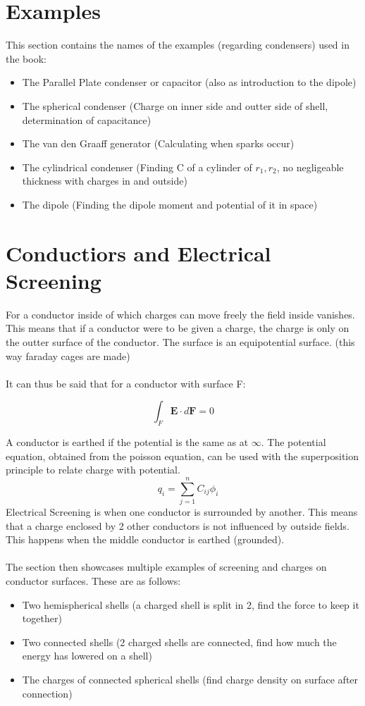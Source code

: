 \section{Examples}
This section contains the names of the examples (regarding condensers) used in the book:
\begin{itemize}
    \item The Parallel Plate condenser or capacitor (also as introduction to the dipole)
    \item The spherical condenser (Charge on inner side and outter side of shell, determination of capacitance)
    \item The van den Graaff generator (Calculating when sparks occur)
    \item The cylindrical condenser (Finding C of a cylinder of $r_1,r_2$, no negligeable thickness with charges in and outside)
    \item The dipole (Finding the dipole moment and potential of it in space)
\end{itemize}

\section{Conductiors and Electrical Screening}
For a conductor inside of which charges can move freely the field inside vanishes. 
This means that if a conductor were to be given a charge, the charge is only on the outter surface of the conductor. The surface is an equipotential surface. (this way faraday cages are made)\\
\\
\noindent It can thus be said that for a conductor with surface F:

\begin{equation}
    \int_F \textbf{E} \cdot d\textbf{F} = 0
\end{equation}

A conductor is earthed if the potential is the same as at $\infty$. The potential equation, obtained from the poisson equation, can be used with the superposition principle to relate charge with potential.
\begin{equation}
    \quad q_i = \sum_{j=1}^nC_{ij}\phi_i
\end{equation}
Electrical Screening is when one conductor is surrounded by another. This means that a charge enclosed by 2 other conductors is not influenced by outside fields. This happens when the middle conductor
is earthed (grounded).\\
\\
\noindent The section then showcases multiple examples of screening and charges on conductor surfaces. These are as follows:
\begin{itemize}
    \item Two hemispherical shells (a charged shell is split in 2, find the force to keep it together)
    \item Two connected shells (2 charged shells are connected, find how much the energy has lowered on a shell)
    \item The charges of connected spherical shells (find charge density on surface after connection)
\end{itemize} 

